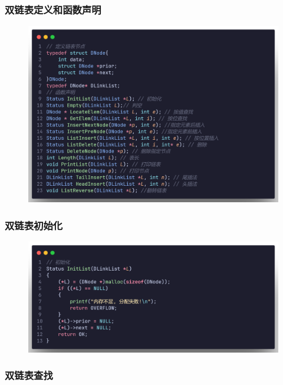 \subsubsection{双链表定义和函数声明}

\begin{figure}[H]
    \centering
    \includegraphics[scale=0.2]{"figure/Note/LinearList/DlFunction.png"}
\end{figure}

\subsubsection{双链表初始化}

\begin{figure}[H]
    \centering
    \includegraphics[scale=0.2]{"figure/Note/LinearList/DlInit.png"}
\end{figure}

\subsubsection{双链表查找}

